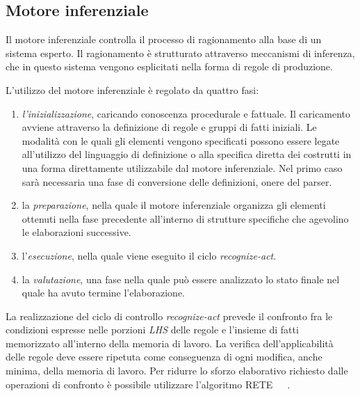 \subsection{Motore inferenziale}\label{par:motore-inferenziale}

Il motore inferenziale controlla il processo di ragionamento alla base di un sistema esperto. Il ragionamento è strutturato attraverso meccanismi di inferenza, che in questo sistema vengono esplicitati nella forma di regole di produzione.

L'utilizzo del motore inferenziale è regolato da quattro fasi:

\begin{enumerate}
	\item \emph{l'inizializzazione}, caricando conoscenza procedurale e fattuale. Il caricamento avviene attraverso la definizione di regole e gruppi di fatti iniziali. Le modalità con le quali gli elementi vengono specificati possono essere legate all'utilizzo del linguaggio di definizione o alla specifica diretta dei costrutti in una forma direttamente utilizzabile dal motore inferenziale. Nel primo caso sarà necessaria una fase di conversione delle definizioni, onere del parser.
	\item la \emph{preparazione}, nella quale il motore inferenziale organizza gli elementi ottenuti nella fase precedente all'interno di strutture specifiche che agevolino le elaborazioni successive. 
	\item l'\emph{esecuzione}, nella quale viene eseguito il ciclo \emph{recognize-act}.
	\item la \emph{valutazione}, una fase nella quale può essere analizzato lo stato finale nel quale ha avuto termine l'elaborazione.
\end{enumerate}

La realizzazione del ciclo di controllo \emph{recognize-act} prevede il confronto fra le condizioni espresse nelle porzioni \emph{LHS} delle regole e l'insieme di fatti memorizzato all'interno della memoria di lavoro. La verifica dell'applicabilità delle regole deve essere ripetuta come conseguenza di ogni modifica, anche minima, della memoria di lavoro. Per ridurre lo sforzo elaborativo richiesto dalle operazioni di confronto è possibile utilizzare l'algoritmo RETE~\cite{forgy1979}~\cite{forgy1982}~\cite{Doorenbos95productionmatching}.


